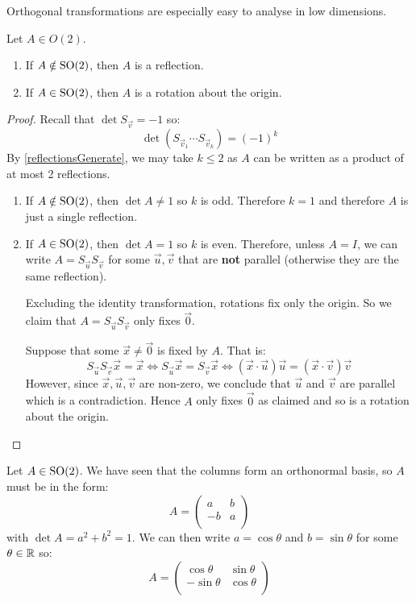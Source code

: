 \documentclass[../main.tex]{subfiles}
\begin{document}
Orthogonal transformations are especially easy to analyse in low dimensions.
\begin{lemma}[Elements of $O(2)$]
  Let $A \in O(2)$.
  \begin{enumerate}
    \item If $A \notin \mathrm{SO}(2)$, then $A$ is a reflection.
    \item If $A \in \mathrm{SO}(2)$, then $A$ is a rotation about the origin.
  \end{enumerate}
\end{lemma}
\begin{proof}
  Recall that $\det S_{\vec{v}} = -1$ so:
  \[
    \det(S_{\vec{v}_1} \cdots S_{\vec{v}_k}) = (-1)^{k}
  \]
  By \cref{reflectionsGenerate}, we may take $k \leq 2$ as $A$ can be written as a product of at most 2 reflections.

  \begin{enumerate}
    \item If $A \notin \mathrm{SO}(2)$, then $\det A \neq 1$ so $k$ is odd.
      Therefore $k = 1$ and therefore $A$ is just a single reflection.
    \item If $A \in \mathrm{SO}(2)$, then $\det A = 1$ so $k$ is even.
      Therefore, unless $A = I$, we can write $A = S_{\vec{u}} S_{\vec{v}}$ for some $\vec{u}, \vec{v}$ that are \textbf{not} parallel (otherwise they are the same reflection).

      Excluding the identity transformation, rotations fix only the origin.
      So we claim that $A = S_{\vec{u}} S_{\vec{v}}$ only fixes $\vec{0}$.

      Suppose that some $\vec{x} \neq \vec{0}$ is fixed by $A$.
      That is:
      \[
        S_{\vec{u}}S_{\vec{v}}\vec{x} = \vec{x} \iff S_{\vec{u}} \vec{x} = S_{\vec{v}}\vec{x} \iff (\vec{x} \cdot \vec{u})\vec{u} = (\vec{x} \cdot \vec{v})\vec{v}
      \]
      However, since $\vec{x}, \vec{u}, \vec{v}$ are non-zero, we conclude that $\vec{u}$ and $\vec{v}$ are parallel which is a contradiction.
      Hence $A$ only fixes $\vec{0}$ as claimed and so is a rotation about the origin.
  \end{enumerate}
\end{proof}
\begin{remark}
  Let $A \in \mathrm{SO}(2)$.
  We have seen that the columns form an orthonormal basis, so $A$ must be in the form:
  \[
    A = \begin{pmatrix}
    a & b \\
    -b & a \\
    \end{pmatrix}
  \]
  with $\det A = a^2 + b^2 = 1$.
  We can then write $a = \cos \theta$ and $b = \sin \theta$ for some $\theta \in \mathbb{R}$ so:
  \[
    A = \begin{pmatrix}
    \cos \theta & \sin \theta \\
    -\sin \theta & \cos \theta \\
    \end{pmatrix}
  \]
\end{remark}
\end{document}
